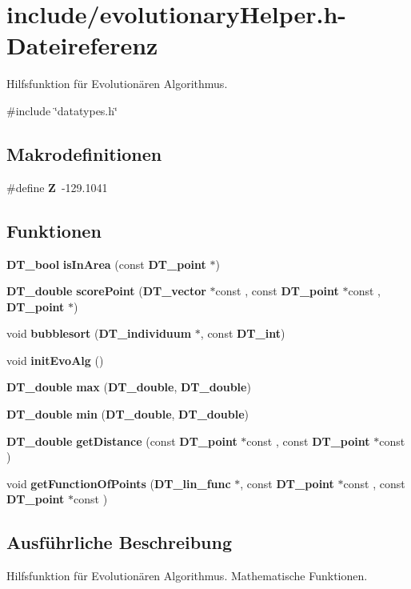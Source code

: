 \section{include/evolutionaryHelper.h-\/Dateireferenz}
\label{evolutionary_helper_8h}


Hilfsfunktion für Evolutionären Algorithmus.  


{\ttfamily \#include \char`\"{}datatypes.h\char`\"{}}\par
\subsection*{Makrodefinitionen}
\begin{DoxyCompactItemize}
\item 
\#define {\bf Z}~-\/129.1041
\end{DoxyCompactItemize}
\subsection*{Funktionen}
\begin{DoxyCompactItemize}
\item 
{\bf DT\_\-bool} {\bf isInArea} (const {\bf DT\_\-point} $\ast$)
\item 
{\bf DT\_\-double} {\bf scorePoint} ({\bf DT\_\-vector} $\ast$const , const {\bf DT\_\-point} $\ast$const , {\bf DT\_\-point} $\ast$)
\item 
void {\bf bubblesort} ({\bf DT\_\-individuum} $\ast$, const {\bf DT\_\-int})
\item 
void {\bf initEvoAlg} ()
\item 
{\bf DT\_\-double} {\bf max} ({\bf DT\_\-double}, {\bf DT\_\-double})
\item 
{\bf DT\_\-double} {\bf min} ({\bf DT\_\-double}, {\bf DT\_\-double})
\item 
{\bf DT\_\-double} {\bf getDistance} (const {\bf DT\_\-point} $\ast$const , const {\bf DT\_\-point} $\ast$const )
\item 
void {\bf getFunctionOfPoints} ({\bf DT\_\-lin\_\-func} $\ast$, const {\bf DT\_\-point} $\ast$const , const {\bf DT\_\-point} $\ast$const )
\end{DoxyCompactItemize}


\subsection{Ausführliche Beschreibung}
Hilfsfunktion für Evolutionären Algorithmus. Mathematische Funktionen. 

